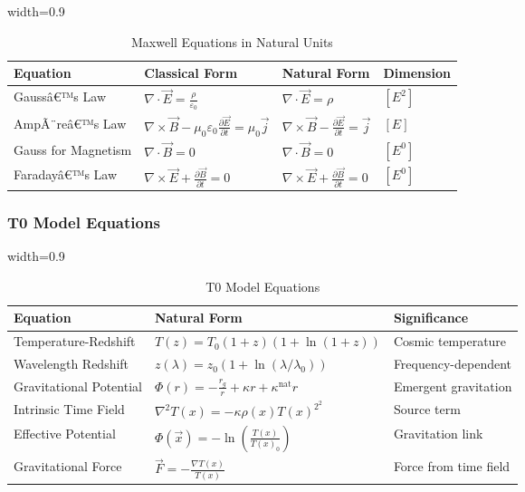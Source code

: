 ﻿\documentclass[12pt,a4paper]{article}
\newcommand{\Tfield}{T(x)}
\newcommand{\tablescale}{0.9}
\begin{document}
\begin{itemize}
	\begin{table}[htbp]
		\centering
		\begin{adjustbox}{width=\tablescale\textwidth}
			\begin{tabular}{llll}
				\toprule
				\textbf{Equation} & \textbf{Classical Form} & \textbf{Natural Form} & \textbf{Dimension} \\
				\midrule
				Gaussâ€™s Law & \(\nabla \cdot \vec{E} = \frac{\rho}{\varepsilon_0}\) & \(\nabla \cdot \vec{E} = \rho\) & \([E^2]\) \\
				AmpÃ¨reâ€™s Law & \(\nabla \times \vec{B} - \mu_0 \varepsilon_0 \frac{\partial \vec{E}}{\partial t} = \mu_0 \vec{j}\) & \(\nabla \times \vec{B} - \frac{\partial \vec{E}}{\partial t} = \vec{j}\) & \([E]\) \\
				Gauss for Magnetism & \(\nabla \cdot \vec{B} = 0\) & \(\nabla \cdot \vec{B} = 0\) & \([E^0]\) \\
				Faradayâ€™s Law & \(\nabla \times \vec{E} + \frac{\partial \vec{B}}{\partial t} = 0\) & \(\nabla \times \vec{E} + \frac{\partial \vec{B}}{\partial t} = 0\) & \([E^0]\) \\
				\bottomrule
			\end{tabular}
		\end{adjustbox}
		\caption{Maxwell Equations in Natural Units}
		\label{tab:maxwell}
	\end{table}
	
	\subsubsection{T0 Model Equations}
	\label{subsec:t0_equations}
	
	\begin{table}[htbp]
		\centering
		\begin{adjustbox}{width=\tablescale\textwidth}
			\begin{tabular}{lll}
				\toprule
				\textbf{Equation} & \textbf{Natural Form} & \textbf{Significance} \\
				\midrule
				Temperature-Redshift & \(T(z) = T_0 (1+z)(1+\ln(1+z))\) & Cosmic temperature \\
				Wavelength Redshift & \(z(\lambda) = z_0 (1+\ln(\lambda/\lambda_0))\) & Frequency-dependent \\
				Gravitational Potential & \(\Phi(r) = -\frac{r_g}{r} + \kappa r + \kappa^{\text{nat}} r\) & Emergent gravitation \\
				Intrinsic Time Field & \(\nabla^2 \Tfield = -\kappa \rho(x) \Tfield^2^2\) & Source term \\
				Effective Potential & \(\Phi(\vec{x}) = -\ln\left(\frac{\Tfield}{\Tfield_0}\right)\) & Gravitation link \\
				Gravitational Force & \(\vec{F} = -\frac{\nabla \Tfield}{\Tfield}\) & Force from time field \\
				\bottomrule
			\end{tabular}
		\end{adjustbox}
		\caption{T0 Model Equations}
		\label{tab:t0_equations}
	\end{table}
	

\end{itemize}
\end{document}
